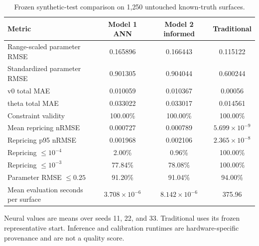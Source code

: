 \begin{table}[htbp]
\centering
\caption{Frozen synthetic-test comparison on 1{,}250 untouched known-truth surfaces.}
\label{tab:primary-comparison}
\begin{tabular}{lccc}
\toprule
Metric & Model 1 ANN & Model 2 informed & Traditional \\
\midrule
Range-scaled parameter RMSE & 0.165896 & 0.166443 & 0.115122 \\
Standardized parameter RMSE & 0.901305 & 0.904044 & 0.600244 \\
v0 total MAE & 0.010059 & 0.010367 & 0.00056 \\
theta total MAE & 0.033022 & 0.033017 & 0.014561 \\
Constraint validity & 100.00\% & 100.00\% & 100.00\% \\
Mean repricing nRMSE & 0.000727 & 0.000789 & $5.699 \times 10^{-9}$ \\
Repricing p95 nRMSE & 0.001968 & 0.002106 & $2.365 \times 10^{-8}$ \\
Repricing $\leq 10^{-4}$ & 2.00\% & 0.96\% & 100.00\% \\
Repricing $\leq 10^{-3}$ & 77.84\% & 78.08\% & 100.00\% \\
Parameter RMSE $\leq 0.25$ & 91.20\% & 91.04\% & 94.00\% \\
Mean evaluation seconds per surface & $3.708 \times 10^{-6}$ & $8.142 \times 10^{-6}$ & 375.96 \\
\bottomrule
\end{tabular}
\par\vspace{0.35em}
\begin{minipage}{0.94\linewidth}\small Neural values are means over seeds 11, 22, and 33. Traditional uses its frozen representative start. Inference and calibration runtimes are hardware-specific provenance and are not a quality score.\end{minipage}
\end{table}
